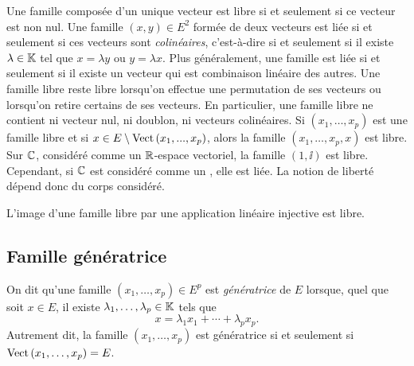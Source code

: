 \documentclass{magnolia}
\begin{document}
\begin{remarques}
\remarque[utile=-3] Une famille composée d'un unique vecteur est libre si et seulement si
  ce vecteur est non nul. Une famille $(x,y)\in E^2$ formée de deux vecteurs est liée si et
  seulement si ces vecteurs sont \emph{colinéaires}, c'est-à-dire si et seulement si il existe
  $\lambda\in\mathbb{K}$ tel que $x=\lambda y$ ou $y=\lambda x$. Plus généralement, une famille est
  liée si et seulement si il existe un vecteur qui est combinaison linéaire des
  autres.  
\remarque[utile=-3] Une famille libre reste libre lorsqu'on effectue une permutation
  de ses vecteurs ou lorsqu'on retire certains de ses vecteurs. En particulier, une famille
  libre ne contient ni vecteur nul, ni doublon, ni vecteurs colinéaires.
\remarque Si $(x_1,\ldots,x_p)$ est
une famille libre et si $x\in E\setminus\operatorname{Vect}\left(x_1,...,x_p\right)$, alors la famille
$(x_1,\ldots,x_p,x)$ est libre.
\remarque[utile=-1] Sur $\mathbb{C}$, considéré comme un $\mathbb{R}$-espace vectoriel, la famille
  $(1,\ii)$ est libre. Cependant, si $\mathbb{C}$ est considéré comme un \Cev, elle est liée. La notion
  de liberté dépend donc du corps considéré.
\end{remarques}

\begin{proposition}
L'image d'une famille libre par une application linéaire injective est libre.
\end{proposition}

\subsection{Famille génératrice}

\begin{definition}[utile=-3]
On dit qu'une famille $(x_1,\ldots,x_p)\in E^p$ est \emph{génératrice} de $E$ lorsque, quel que soit
$x\in E$, il existe $\lambda_1,\ldots,\lambda_p\in\mathbb{K}$ tels que
\[x=\lambda_1 x_1+\cdots+\lambda_p x_p.\]
Autrement dit, la famille $(x_1,\ldots,x_p)$ est génératrice si et seulement si
$\operatorname{Vect}\left(x_1,\ldots,x_p\right)=E$.
\end{definition}
\end{document}

